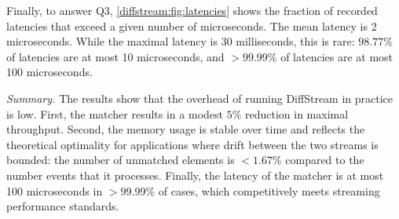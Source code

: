 Finally, to answer Q3,
\cref{diffstream:fig:latencies} shows the fraction of recorded latencies
that exceed a given number of microseconds.
The mean latency is 2 microseconds.
While the maximal latency is 30 milliseconds, this is rare:
$98.77\%$ of latencies
are at most 10 microseconds, and $>99.99\%$ of latencies are at most
100 microseconds.

\emph{Summary.} The results show that the overhead of running DiffStream in practice is low.
First, the matcher results in a modest $5\%$ reduction in maximal throughput.
Second, the memory usage is stable over time and reflects the theoretical optimality for applications where drift between the two streams is bounded:
the number of unmatched elements is $<1.67\%$ compared to the number events that it processes.
Finally, the latency of the matcher is at most 100 microseconds in $>99.99\%$ of cases, which competitively meets streaming performance standards.

